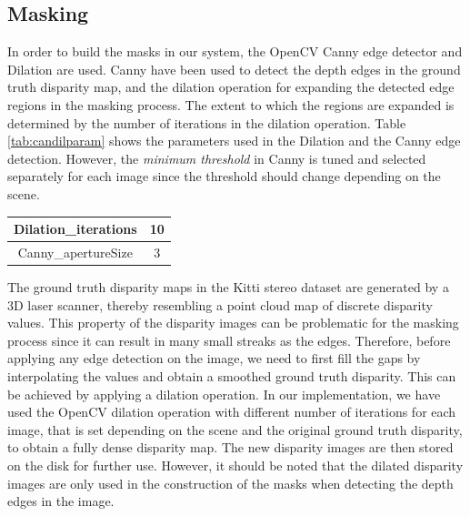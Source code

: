 \subsection{Masking}
In order to build the masks in our system, the OpenCV Canny edge detector and Dilation are used.
Canny have been used to detect the depth edges in the ground truth disparity map, and the dilation operation 
for expanding the detected edge regions in the masking process. The extent to which the regions are expanded
is determined by the number of iterations in the dilation operation. Table \ref{tab:candilparam} shows the parameters used in the Dilation
and the Canny edge detection. However, the \textit{minimum threshold} in Canny is tuned and selected separately for each image 
since the threshold should change depending on the scene.

{\footnotesize
\begin{minipage}{\linewidth}
\begin{center}
\label{tab:candilparam}
\begin{tabular}{ |c|c| }
\hline
Dilation\_iterations & 10 \\  \hline
Canny\_apertureSize & 3 \\ \hline
\end{tabular}
\end{center}
\end{minipage} \newline
}

The ground truth disparity maps in the Kitti stereo dataset are generated by a 3D laser scanner, thereby resembling
a point cloud map of discrete disparity values. This property of the disparity images 
can be problematic for the masking process since it can result in many small streaks as the edges.
Therefore, before applying any edge
detection on the image, we need to first fill the gaps by interpolating the values and obtain a smoothed ground truth disparity.
This can be achieved by applying a dilation operation.
In our implementation, we have used the OpenCV dilation operation with different number of iterations for each image, that is set depending on the scene 
and the original ground truth disparity, to obtain a fully dense disparity map. 
The new disparity images are then stored on the disk for further use.
However, it should be noted that the dilated disparity images are only used in the construction of the masks when detecting the depth
edges in the image.

